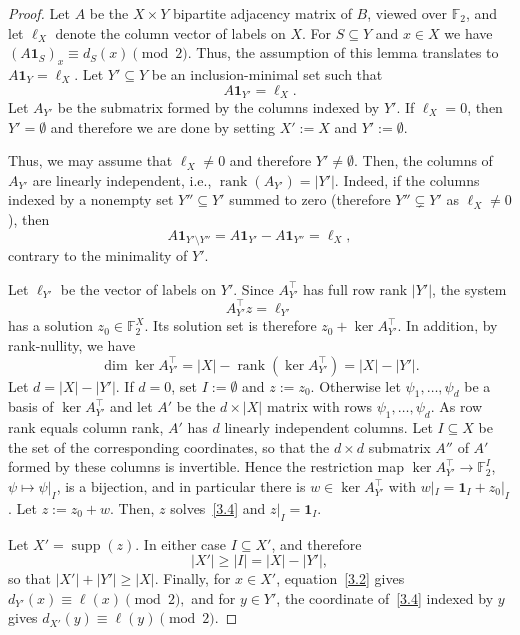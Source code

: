 \documentclass[10pt,a4paper]{amsart}
\newcommand{\supp}{\operatorname{supp}}
\newcommand{\rank}{\operatorname{rank}}
\newcommand{\F}{\mathbb{F}}
\newcommand{\1}{\mathbf{1}}
\begin{document}
	\begin{proof}
		Let $A$ be the $X\times Y$ bipartite adjacency matrix of $B$, viewed over
		$\F_2$, and let $\ell_X$ denote the column vector of labels on $X$.  For $S\subseteq Y$ and
		$x\in X$ we have $(A\1_S)_x\equiv d_S(x)\pmod 2$. Thus, the assumption of this lemma translates to $A\mathbf 1_Y=\ell_X$.
		Let $Y'\subseteq Y$ be an inclusion-minimal set such that
		\begin{equation}\label{3.2}
			A\mathbf 1_{Y'}=\ell_X.
		\end{equation}
        Let $A_{Y'}$ be the submatrix formed by the columns indexed
		by $Y'$. If $\ell_X=0$, then $Y'=\emptyset$ and therefore we are done by setting $X':=X$ and $Y':=\emptyset$. 
		
		Thus, we may assume that $\ell_X\neq 0$ and therefore $Y'\neq \emptyset$. Then, the columns of $A_{Y'}$ are linearly independent, i.e., $\rank(A_{Y'})=|Y'|$. Indeed, if the columns indexed by a nonempty set $Y''\subseteq Y'$ summed to zero (therefore $Y''\subsetneq Y'$ as $\ell_X\neq 0$), then
		\[
		A\mathbf 1_{Y'\setminus Y''}
		=A\mathbf 1_{Y'}-A\mathbf 1_{Y''}
		=\ell_X,
		\]
		contrary to the minimality of $Y'$.  
		
		Let $\ell_{Y'}$ be the vector of labels on $Y'$.  Since $A_{Y'}^{\top}$ has full row
		rank $|Y'|$, the system
		\begin{equation}\label{3.4}
			A_{Y'}^{\top} z=\ell_{Y'} 
		\end{equation}
		has a solution $z_0\in\F_2^X$.  Its solution set is therefore $z_0+\ker A_{Y'}^{\top}$. In addition, by rank-nullity, we have
	\[
			\dim \ker A_{Y'}^{\top}=|X|-\rank (\ker A_{Y'}^{\top})=|X|-|Y'| . \]
		Let $d=|X|-|Y'|$.  If $d=0$, set $I:=\emptyset$ and $z:=z_0$.  Otherwise let $\psi_1,\dots,\psi_d$ be a basis of $\ker A_{Y'}^{\top}$ and let $A'$ be the $d\times |X|$ matrix with rows $\psi_1,\dots,\psi_d$.  As row rank equals column rank, $A'$ has $d$ linearly independent columns. Let $I\subseteq X$ be the set of the corresponding coordinates, so that the $d\times d$ submatrix $A''$ of $A'$ formed by these columns is invertible.  Hence the restriction map $\ker A_{Y'}^{\top}\to\F_2^{I}$, $\psi\mapsto \psi|_I$, is a bijection, and in particular there is $w\in \ker A_{Y'}^{\top}$ with $w|_I=\1_I+z_0|_I$.  Let $z:=z_0+w$. Then, $z$ solves~\eqref{3.4} and $z|_I=\1_I$.
		
		Let $X'=\supp (z)$.  In either case $I\subseteq X'$, and therefore
		\[
			|X'|\ge |I|=|X|-|Y'|, 
		\]
		so that $|X'|+|Y'|\ge |X|$.  Finally, for $x\in X'$, equation~\eqref{3.2} gives
		$
		d_{Y'}(x)\equiv \ell(x)\pmod 2,
		$
		and for $y\in Y'$, the coordinate of~\eqref{3.4} indexed by $y$ gives
		$
		d_{X'}(y)\equiv \ell(y)\pmod 2.
		$
	\end{proof}
	
\end{document}
